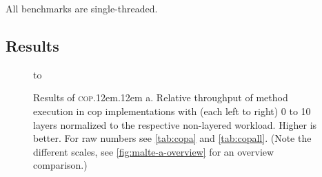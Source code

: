 \documentclass[preprint,english,10pt,nonatbib]{sigplanconf}
\DeclareRobustCommand*\copa{\textsc{cop}\kern .12em\oldstylenums{09}\kern .12em a\xspace}
\begin{document}
All benchmarks are single-threaded.

\subsection{Results}

\begin{figure}[htb]
  \centering
  \hbox to 
\caption{Results of \copa. Relative throughput of method execution in
  \protect\acs{cop} implementations with (each left to right) 0 to 10 layers
  normalized to the respective non-layered workload. Higher is better. For raw
  numbers see \autoref{tab:copa} and \autoref{tab:copall}. (Note
  the different scales, see \autoref{fig:malte-a-overview} for an overview
  comparison.)}
  \label{fig:malte-a}
\end{figure}
\end{document}
